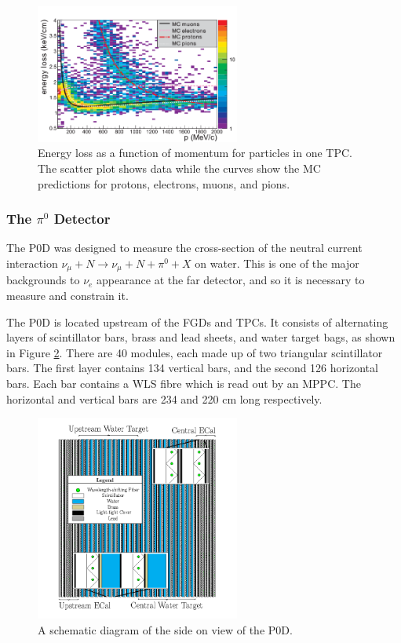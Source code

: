 \begin{figure}[!htbp]
\centering
\includegraphics*[width=0.6\textwidth,clip]{figs/tpcpid}
\caption{Energy loss as a function of momentum for particles in one TPC. The scatter plot shows data while the curves show the MC predictions for protons, electrons, muons, and pions.} \label{fig:tpcpid}
\end{figure}


\subsubsection{The $\pi^0$ Detector}\label{sec:pod}

The P0D was designed to measure the cross-section of the neutral current interaction $\nu_\mu + N \rightarrow \nu_\mu + N + \pi^0 + X$ on water. This is one of the major backgrounds to $\nu_e$ appearance at the far detector, and so it is necessary to measure and constrain it.

The P0D is located upstream of the FGDs and TPCs. It consists of alternating layers of scintillator bars, brass and lead sheets, and water target bags, as shown in Figure \ref{fig:podconstruction}. There are 40 modules, each made up of two triangular scintillator bars. The first layer contains 134 vertical bars, and the second 126 horizontal bars. Each bar contains a WLS fibre which is read out by an MPPC. The horizontal and vertical bars are 234 and 220 cm long respectively.

\begin{figure}[!htbp]
\centering
\includegraphics*[width=0.6\textwidth,clip]{figs/podconstruction}
\caption{A schematic diagram of the side on view of the P0D.}\label{fig:podconstruction}
\end{figure}

